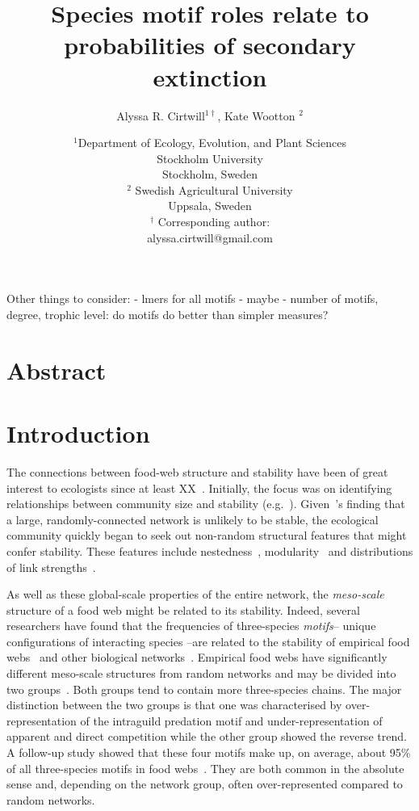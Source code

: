 \documentclass[12pt]{article}
\title{Species motif roles relate to probabilities of secondary extinction}
\author{Alyssa R. Cirtwill$^{1\dagger}$, Kate Wootton $^{2}$}
\date{\small$^1$Department of Ecology, Evolution, and Plant Sciences\\ 
Stockholm University\\
Stockholm, Sweden\\
\medskip
\small$^2$ Swedish Agricultural University\\
Uppsala, Sweden\\
\medskip
$^\dagger$ Corresponding author:\\
alyssa.cirtwill@gmail.com\\
 }
\begin{document}
 
\maketitle 
\raggedright
\setlength{\parindent}{15pt} 


Other things to consider:
- lmers for all motifs
- maybe %
- number of motifs, degree, trophic level: do motifs do better than simpler measures?




\section*{Abstract}


\section*{Introduction}

	The connections between food-web structure and stability have been of great interest to ecologists since at least XX~\citep{}. Initially, the focus was on identifying relationships between community size and stability (e.g.~\citealp{Gardner1970,May1972}). Given~\citet{May1972}'s finding that a large, randomly-connected network is unlikely to be stable, the ecological community quickly began to seek out non-random structural features that might confer stability. These features include nestedness~\citep{}, modularity~\citep{} and distributions of link strengths~\citep{McCann1998,Gross2009,Rooney2012,Wootton2016}. 


	As well as these global-scale properties of the entire network, the \emph{meso-scale} structure of a food web might be related to its stability. Indeed, several researchers have found that the frequencies of three-species \emph{motifs}-- unique configurations of interacting species --are related to the stability of empirical food webs~\citep{Stouffer2007,Borrelli2015,Monteiro2016} and other biological networks~\citep{Prill2005}. Empirical food webs have significantly different meso-scale structures from random networks and may be divided into two groups~\citep{Stouffer2007}. Both groups tend to contain more three-species chains. The major distinction between the two groups is that one was characterised by over-representation of the intraguild predation motif and under-representation of apparent and direct competition while the other group showed the reverse trend. A follow-up study showed that these four motifs make up, on average, about 95\% of all three-species motifs in food webs~\citep{Stouffer2010b}. They are both common in the absolute sense and, depending on the network group, often over-represented compared to random networks.
\end{document}
